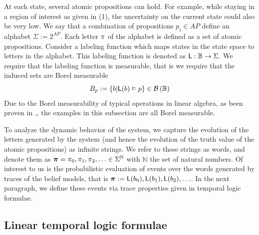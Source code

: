 \documentclass{ifacconf}
\newcommand{\red}[1]{{\color{red} #1}}
\renewcommand{\axx}[1]{{\color{orange} Ali: #1}}
\newcommand{\new}[1]{{\color{blue}#1}}
\begin{document}
      \new{At each state, several  atomic propositions can hold. For example, while staying in a region of interest as given in (1), the uncertainty on the current state could also be very low.}
   \new{We say that a combination of propositions $p_i\in AP$ define an alphabet $\Sigma := 2^{AP}$. Each letter $\pi$ of the alphabet is defined as a set of atomic propositions.  Consider  a labeling function which maps states in the state space to letters in the alphabet. This labeling function is denoted as $\mathsf{L}:\mathbb{B}\rightarrow \Sigma$.  }
We require that the labeling function is measurable, that is we require that the induced sets  are Borel measurable
\[B_p:=\{b|\mathsf{L}(b)\vDash p \}\in \mathcal{B}\left(\mathbb{B}\right)\]    
 Due to the Borel measurability of typical operations in linear algebra,  as been proven in \citep{azoff1974borel},\citep[page 116]{lang1993real}, the examples in this subsection are all Borel measurable.
 
 \new{ To analyze the dynamic behavior of the system, we capture the evolution of the letters generated by the system (and hence the evolution of the truth value of the atomic propositions) as 
infinite strings. We refer to these strings as words, and denote them as ${\boldsymbol{\pi}}=\pi_0,\pi_1,\pi_2,\ldots\in\Sigma^{\mathbb{N}}$ with $\mathbb N$ the set of natural numbers.
Of interest to us is the probabilistic evaluation of events over the words generated by traces of the belief models, that is 
${\boldsymbol{\pi}}:=\mathsf{L}(b_0),\mathsf{L}(b_1),\mathsf{L}(b_2), \ldots$. %
In the next paragraph, we define these events via trace properties given in temporal logic formulae.}
  
  \subsection{Linear temporal logic formulae}
    
\end{document}
